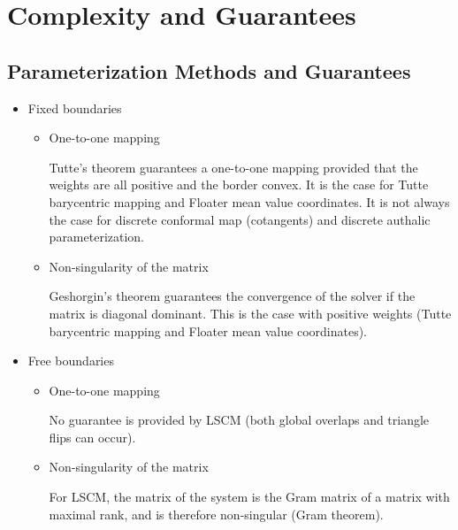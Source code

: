 \section{Complexity and Guarantees}


\subsection{Parameterization Methods and Guarantees}

\begin{itemize}

\item Fixed boundaries

    \begin{itemize}

    \item One-to-one mapping

        Tutte's theorem guarantees a one-to-one mapping provided that the weights are all positive
        and the border convex.
        It is the case for Tutte barycentric mapping and Floater mean value coordinates.
        It is not always the case for discrete conformal map (cotangents) and
        discrete authalic parameterization.

    \item Non-singularity of the matrix

        Geshorgin's theorem guarantees the convergence of the solver if the matrix is diagonal dominant.
        This is the case with positive weights (Tutte barycentric mapping and Floater mean value coordinates).

    \end{itemize}

\item Free boundaries

    \begin{itemize}

    \item One-to-one mapping

        No guarantee is provided by LSCM (both global overlaps and triangle flips can
        occur).

    \item Non-singularity of the matrix

        For LSCM, the matrix of the system is the Gram matrix of a matrix with maximal rank,
        and is therefore non-singular (Gram theorem).

    \end{itemize}

\end{itemize}


